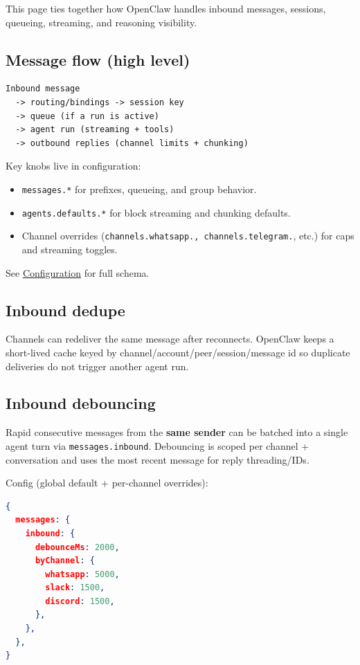 This page ties together how OpenClaw handles inbound messages, sessions, queueing,
streaming, and reasoning visibility.

\subsection{Message flow (high level)}


\begin{lstlisting}
Inbound message
  -> routing/bindings -> session key
  -> queue (if a run is active)
  -> agent run (streaming + tools)
  -> outbound replies (channel limits + chunking)
\end{lstlisting}


Key knobs live in configuration:

\begin{itemize}
  \item \texttt{messages.*} for prefixes, queueing, and group behavior.
  \item \texttt{agents.defaults.*} for block streaming and chunking defaults.
  \item Channel overrides (\texttt{channels.whatsapp.\textit{}, \texttt{channels.telegram.}}, etc.) for caps and streaming toggles.
\end{itemize}


See \href{/gateway/configuration}{Configuration} for full schema.

\subsection{Inbound dedupe}


Channels can redeliver the same message after reconnects. OpenClaw keeps a
short-lived cache keyed by channel/account/peer/session/message id so duplicate
deliveries do not trigger another agent run.

\subsection{Inbound debouncing}


Rapid consecutive messages from the \textbf{same sender} can be batched into a single
agent turn via \texttt{messages.inbound}. Debouncing is scoped per channel + conversation
and uses the most recent message for reply threading/IDs.

Config (global default + per-channel overrides):

\begin{lstlisting}[language=json]
{
  messages: {
    inbound: {
      debounceMs: 2000,
      byChannel: {
        whatsapp: 5000,
        slack: 1500,
        discord: 1500,
      },
    },
  },
}
\end{lstlisting}


